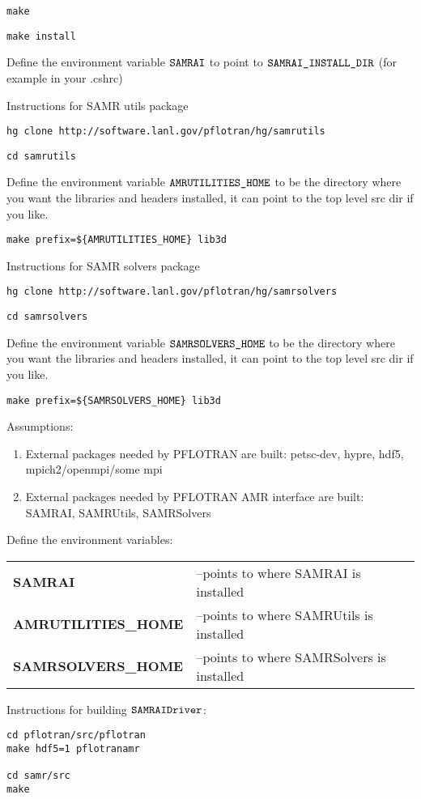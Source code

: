 \documentclass[12pt]{article}
\begin{document}
{\tt make}

{\tt make install}

Define the environment variable $\verb|SAMRAI|$ to point to $\verb|SAMRAI_INSTALL_DIR|$ (for example in your .cshrc)

Instructions for SAMR utils package

{\tt hg clone  http://software.lanl.gov/pflotran/hg/samrutils}

{\tt cd samrutils}

Define the environment variable $\verb|AMRUTILITIES_HOME|$ to be the directory where you want the libraries and headers installed, it can point to the top level src dir if you like.

\verb|make prefix=${AMRUTILITIES_HOME} lib3d|

Instructions for SAMR solvers package

{\tt hg clone  http://software.lanl.gov/pflotran/hg/samrsolvers}

{\tt cd samrsolvers}

Define the environment variable $\verb|SAMRSOLVERS_HOME|$ to be the directory where you want the libraries and headers installed, it can point to the top level src dir if you like.

\verb|make prefix=${SAMRSOLVERS_HOME} lib3d|

\noindent
Assumptions:
\begin{enumerate}
\item External packages needed by PFLOTRAN are built: petsc-dev, hypre,  
hdf5, \linebreak mpich2/openmpi/some mpi
\item External packages needed by PFLOTRAN AMR interface are built:  
SAMRAI, SAMRUtils, SAMRSolvers
\end{enumerate}

\noindent
Define the environment variables:
\begin{center}
\begin{tabularx}{\linewidth}{lX}
\bf SAMRAI &--points to where SAMRAI is installed\\
\bf AMRUTILITIES\_HOME &--points to where SAMRUtils is installed\\
\bf SAMRSOLVERS\_HOME &--points to where SAMRSolvers is installed
\end{tabularx}
\end{center}

\noindent
Instructions for building $\verb|SAMRAIDriver|$:
\begin{center}
\begin{verbatim}
cd pflotran/src/pflotran
make hdf5=1 pflotranamr

cd samr/src
make
\end{verbatim}
\end{center}
\end{document}
